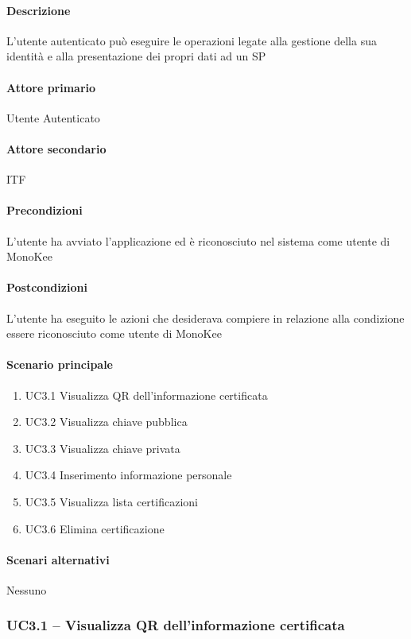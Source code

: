 \paragraph{Descrizione}  L’utente autenticato può eseguire le operazioni legate alla gestione della sua identità e alla presentazione dei propri dati ad un SP
\paragraph{Attore primario}  Utente Autenticato
\paragraph{Attore secondario}  ITF
\paragraph{Precondizioni}  L’utente ha avviato l’applicazione ed è riconosciuto nel sistema come utente di MonoKee
\paragraph{Postcondizioni}  L’utente ha eseguito le azioni che desiderava compiere in relazione alla condizione essere riconosciuto come utente di MonoKee
\paragraph{Scenario principale}  
    \begin{enumerate}
        \item UC3.1 Visualizza QR dell’informazione certificata
        \item UC3.2 Visualizza chiave pubblica
        \item UC3.3 Visualizza chiave privata
        \item UC3.4 Inserimento informazione personale
        \item UC3.5 Visualizza lista certificazioni
        \item UC3.6 Elimina certificazione
    \end{enumerate}
\paragraph{Scenari alternativi}  Nessuno





\subsubsection{UC3.1 – Visualizza QR dell’informazione certificata}
